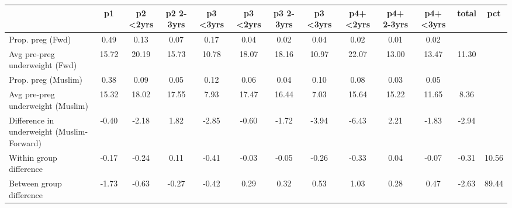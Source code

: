 \begin{tabular}{l*{12}{c}}
\toprule
            &\multicolumn{1}{c}{p1}&\multicolumn{1}{c}{p2 \textless2yrs}&\multicolumn{1}{c}{p2 2-3yrs}&\multicolumn{1}{c}{p3 \textless3yrs}&\multicolumn{1}{c}{p3 \textless2yrs}&\multicolumn{1}{c}{p3 2-3yrs}&\multicolumn{1}{c}{p3 \textless3yrs}&\multicolumn{1}{c}{p4+ \textless2yrs}&\multicolumn{1}{c}{p4+ 2-3yrs}&\multicolumn{1}{c}{p4+ \textless3yrs}&\multicolumn{1}{c}{total}&\multicolumn{1}{c}{pct}\\
\midrule
\midrule
Prop. preg (Fwd)&        0.49&        0.13&        0.07&        0.17&        0.04&        0.02&        0.04&        0.02&        0.01&        0.02&            &            \\
Avg pre-preg underweight (Fwd)&       15.72&       20.19&       15.73&       10.78&       18.07&       18.16&       10.97&       22.07&       13.00&       13.47&       11.30&            \\
Prop. preg (Muslim)&        0.38&        0.09&        0.05&        0.12&        0.06&        0.04&        0.10&        0.08&        0.03&        0.05&            &            \\
Avg pre-preg underweight (Muslim)&       15.32&       18.02&       17.55&        7.93&       17.47&       16.44&        7.03&       15.64&       15.22&       11.65&        8.36&            \\
Difference in underweight (Muslim-Forward)&       -0.40&       -2.18&        1.82&       -2.85&       -0.60&       -1.72&       -3.94&       -6.43&        2.21&       -1.83&       -2.94&            \\
Within group difference&       -0.17&       -0.24&        0.11&       -0.41&       -0.03&       -0.05&       -0.26&       -0.33&        0.04&       -0.07&       -0.31&       10.56\\
Between group difference&       -1.73&       -0.63&       -0.27&       -0.42&        0.29&        0.32&        0.53&        1.03&        0.28&        0.47&       -2.63&       89.44\\
\bottomrule
\end{tabular}
